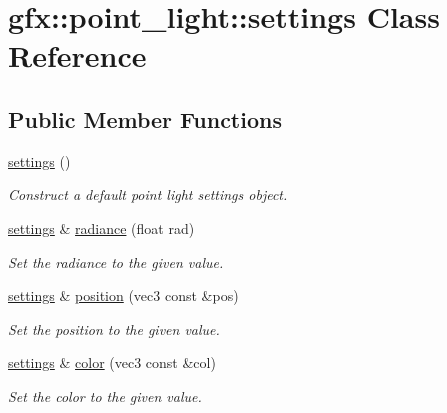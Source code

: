 \hypertarget{classgfx_1_1point__light_1_1settings}{\section{gfx\-:\-:point\-\_\-light\-:\-:settings Class Reference}
\label{classgfx_1_1point__light_1_1settings}
}
\subsection*{Public Member Functions}
\begin{DoxyCompactItemize}
\item 
\hyperlink{classgfx_1_1point__light_1_1settings_ac6840cda2f6aaec5e7b7c703882c40ea}{settings} ()
\begin{DoxyCompactList}\small\item\em Construct a default point light settings object. \end{DoxyCompactList}\item 
\hyperlink{classgfx_1_1point__light_1_1settings}{settings} \& \hyperlink{classgfx_1_1point__light_1_1settings_a603330b89a577c6c30b8fb15d42ac0fd}{radiance} (float rad)
\begin{DoxyCompactList}\small\item\em Set the radiance to the given value. \end{DoxyCompactList}\item 
\hyperlink{classgfx_1_1point__light_1_1settings}{settings} \& \hyperlink{classgfx_1_1point__light_1_1settings_a2fc948b35dcdefb27b41493168af65a3}{position} (vec3 const \&pos)
\begin{DoxyCompactList}\small\item\em Set the position to the given value. \end{DoxyCompactList}\item 
\hyperlink{classgfx_1_1point__light_1_1settings}{settings} \& \hyperlink{classgfx_1_1point__light_1_1settings_a729b943a5c410acc51c1e5e99bf3300f}{color} (vec3 const \&col)
\begin{DoxyCompactList}\small\item\em Set the color to the given value. \end{DoxyCompactList}\end{DoxyCompactItemize}
